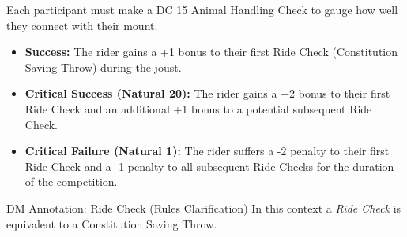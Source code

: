 {\entryfont Each participant must make a DC 15 Animal Handling Check to gauge how well they connect with their mount.
\begin{itemize}
	\renewcommand\labelitemi{\textbf{\textbullet}}
	\item \textbf{Success:} The rider gains a +1 bonus to their first Ride Check (Constitution Saving Throw) during the joust.
	\item \textbf{Critical Success (Natural 20):} The rider gains a +2 bonus to their first Ride Check and an additional +1 bonus to a potential subsequent Ride Check.
	\item \textbf{Critical Failure (Natural 1):} The rider suffers a -2 penalty to their first Ride Check and a -1 penalty to all subsequent Ride Checks for the duration of the competition.
\end{itemize}}
\begingroup
	\DndSetThemeColor[PhbTan]
	\begin{DndComment}{DM Annotation: Ride Check (Rules Clarification)}
		In this context a \textit{Ride Check} is equivalent to a Constitution Saving Throw.
	\end{DndComment}
\endgroup

